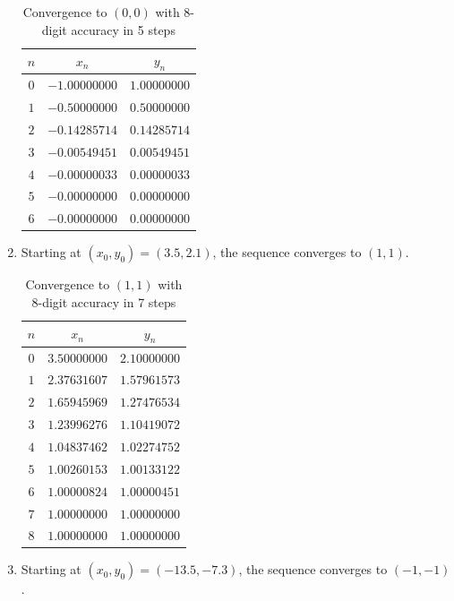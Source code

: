 \begin{example}
\begin{enumerate}
	\begin{table}[ht!]
	\begin{tabular}{|c|c|c|} \hline 
	$n$ & $x_n$ & $y_n$ \\ \hline \hline 
	$0$ & $-1.00000000$ & $1.00000000$ \\ \hline 
	$1$ & $-0.50000000$ & $0.50000000$ \\ \hline 
	$2$ & $-0.14285714$ & $0.14285714$ \\ \hline 
	$3$ & $-0.00549451$ & $0.00549451$ \\ \hline 
	$4$ & $-0.00000033$ & $0.00000033$ \\ \hline 
	$5$ & $-0.00000000$ & $0.00000000$ \\ \hline 
	$6$ & $-0.00000000$ & $0.00000000$ \\ \hline 
	\end{tabular}
	\caption{Convergence to $(0,0)$ with 8-digit accuracy in 5 steps}
	\label{table:00}
	\end{table}
	\item Starting at $(x_0,y_0) = (3.5, 2.1)$, the sequence converges to $(1,1)$.  %
	\begin{table}[ht!]
	\begin{tabular}{|c|c|c|} \hline 
	$n$ & $x_n$ & $y_n$ \\ \hline \hline 
	$0$ & $3.50000000$ & $2.10000000$ \\ \hline 
	$1$ & $2.37631607$ & $1.57961573$ \\ \hline 
	$2$ & $1.65945969$ & $1.27476534$ \\ \hline 
	$3$ & $1.23996276$ & $1.10419072$ \\ \hline 
	$4$ & $1.04837462$ & $1.02274752$ \\ \hline 
	$5$ & $1.00260153$ & $1.00133122$ \\ \hline 
	$6$ & $1.00000824$ & $1.00000451$ \\ \hline 
	$7$ & $1.00000000$ & $1.00000000$ \\ \hline 
	$8$ & $1.00000000$ & $1.00000000$ \\ \hline 
	\end{tabular}
	\caption{Convergence to $(1,1)$ with 8-digit accuracy in 7 steps}
	\label{table:11}
	\end{table}
	\item Starting at $(x_0, y_0) = (-13.5, -7.3)$, the sequence converges to $(-1,-1)$.  %
	\begin{table}[ht!]
	\begin{tabular}{|c|c|c|} \hline 

\end{tabular}
\end{table}
\end{enumerate}
\end{example}
